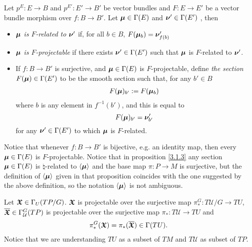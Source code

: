 \begin{definition}\label{defnRelatedProjectable}
Let $p^E:E \to B$ and $p^{E'}:E' \to B'$ be vector bundles and $F: E \to E'$ be a vector bundle morphism over $f: B \to B'$. Let $\bm{\mu} \in \Gamma(E)$ and $\bm{\nu}' \in \Gamma(E')$ , then
    \begin{itemize}
        
    \item \emph{$\bm{\mu}$ is $F$-related to $\bm{\nu}'$} if, for all $b \in B$, $F(\bm{\mu}_b) = \bm{\nu}'_{f(b)}$
    
    \item \emph{$\bm{\mu}$ is $F$-projectable} if there exists $\bm{\nu}' \in \Gamma(E')$ such that $\bm{\mu}$ is $F$-related to $\bm{\nu}'$.
    
    \item If $f:B \to B'$ is surjective, and $\bm{\mu} \in \Gamma(E)$ is $F$-projectable, define \emph{the section $F(\bm{\mu}) \in \Gamma(E')$} to be the smooth section such that, for any $b' \in B$
    \begin{align} \label{funOfSection}
        F(\bm{\mu})_{b'} := F(\bm{\mu}_b)
    \end{align} where $b$ is any element in $f^{-1}(b')$, and this is equal to \[F(\bm{\mu})_{b'} = \bm{\nu}'_{b'}\] for any $\bm{\nu}' \in \Gamma(E')$ to which $\bm{\mu}$ is $F$-related.
    
    \end{itemize}

Notice that whenever $f: B \to B'$ is bijective, e.g. an identity map, then every $\bm{\mu} \in \Gamma(E)$ is $F$-projectable. Notice that in proposition \ref{3.1.3} any section $\bm{\mu} \in \Gamma(E)$ is $\natural$-related to $\left\langle \bm{\mu} \right\rangle$ and the base map $\pi:P \to M$ is surjective, but the definition of $\left\langle \bm{\mu} \right\rangle$ given in that proposition coincides with the one suggested by the above definition, so the notation $\left\langle \bm{\mu} \right\rangle$ is not ambiguous.

\end{definition}

\begin{theorem} \label{theoAnchorUpsect}
Let $\bm{\mathfrak{X}} \in \Gamma_U(TP/G)$. $\bm{\mathfrak{X}}$ is projectable over the surjective map $\pi_*^G: T\mathcal U/G \to TU$, $\overline{\bm{\bm{\mathfrak{X}}}} \in \Gamma^G_{\mathcal U}(TP)$ is projectable over the surjective map $\pi_*: T\mathcal U \to TU$ and
\begin{align} \label{theoAnchorUpsectEqn}
    \pi^G_*(\bm{\mathfrak{X}}) = \pi_*(\overline{\bm{\bm{\mathfrak{X}}}}) \in \Gamma(TU).
\end{align}
Notice that we are understanding $TU$ as a subset of $TM$ and $T\mathcal U$ as subset of $TP$.
\end{theorem}

